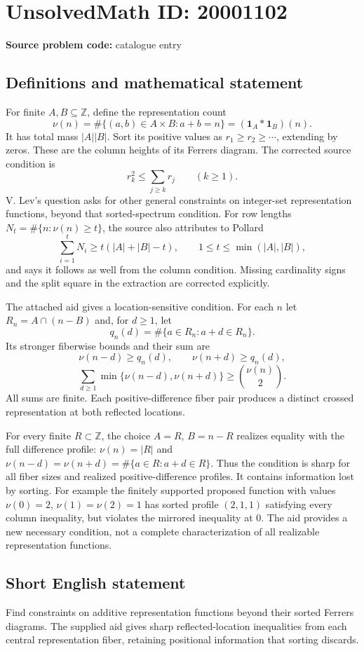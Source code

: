 \documentclass[11pt]{article}
\newcommand{\Z}{\mathbb{Z}}
\begin{document}
\section*{UnsolvedMath ID: 20001102}
\textbf{Source problem code:} catalogue entry
\subsection{Definitions and mathematical statement}
For finite $A,B\subseteq\Z$, define the representation count
\[
\nu(n)=\#\{(a,b)\in A\times B:a+b=n\}=(\mathbf1_A*\mathbf1_B)(n).
\]
It has total mass $|A||B|$. Sort its positive values as $r_1\ge r_2\ge\cdots$, extending by zeros. These are the column heights of its Ferrers diagram. The corrected source condition is
\[
r_k^2\le\sum_{j\ge k}r_j\qquad(k\ge1).
\]
V. Lev's question asks for other general constraints on integer-set representation functions, beyond that sorted-spectrum condition. For row lengths $N_t=\#\{n:\nu(n)\ge t\}$, the source also attributes to Pollard
\[
\sum_{i=1}^tN_i\ge t(|A|+|B|-t),\qquad1\le t\le\min(|A|,|B|),
\]
and says it follows as well from the column condition. Missing cardinality signs and the split square in the extraction are corrected explicitly.

The attached aid gives a location-sensitive condition. For each $n$ let $R_n=A\cap(n-B)$ and, for $d\ge1$, let
\[
q_n(d)=\#\{a\in R_n:a+d\in R_n\}.
\]
Its stronger fiberwise bounds and their sum are
\[
\nu(n-d)\ge q_n(d),\qquad\nu(n+d)\ge q_n(d),
\]
\[
\sum_{d\ge1}\min\{\nu(n-d),\nu(n+d)\}\ge\binom{\nu(n)}2.
\]
All sums are finite. Each positive-difference fiber pair produces a distinct crossed representation at both reflected locations.

For every finite $R\subset\Z$, the choice $A=R$, $B=n-R$ realizes equality with the full difference profile: $\nu(n)=|R|$ and $\nu(n-d)=\nu(n+d)=\#\{a\in R:a+d\in R\}$. Thus the condition is sharp for all fiber sizes and realized positive-difference profiles. It contains information lost by sorting. For example the finitely supported proposed function with values $\nu(0)=2$, $\nu(1)=\nu(2)=1$ has sorted profile $(2,1,1)$ satisfying every column inequality, but violates the mirrored inequality at $0$. The aid provides a new necessary condition, not a complete characterization of all realizable representation functions.
\subsection{Short English statement}
Find constraints on additive representation functions beyond their sorted Ferrers diagrams. The supplied aid gives sharp reflected-location inequalities from each central representation fiber, retaining positional information that sorting discards.
\end{document}
